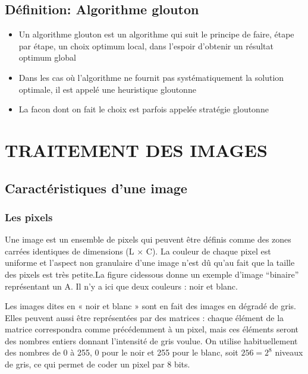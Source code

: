 \documentclass[letterpaper,10pt,english]{jupyterBook}
\begin{document}
\section{Définition: Algorithme glouton}
\label{\detokenize{notebooks/dynamicProgramming/glouton:definition-algorithme-glouton}}\begin{itemize}
\item {} 
\sphinxAtStartPar
Un algorithme glouton est un algorithme qui suit le principe de faire, étape par étape, un choix optimum local, dans l’espoir d’obtenir un résultat optimum global

\item {} 
\sphinxAtStartPar
Dans les cas où l’algorithme ne fournit pas systématiquement la solution optimale, il est appelé une heuristique gloutonne

\item {} 
\sphinxAtStartPar
La facon dont on fait le choix est parfois appelée stratégie gloutonne

\end{itemize}


\chapter{TRAITEMENT DES IMAGES}
\label{\detokenize{notebooks/images/TRAITEMENT-DES-IMAGES:traitement-des-images}}\label{\detokenize{notebooks/images/TRAITEMENT-DES-IMAGES::doc}}

\section{Caractéristiques d’une image}
\label{\detokenize{notebooks/images/TRAITEMENT-DES-IMAGES:caracteristiques-dune-image}}

\subsection{Les pixels}
\label{\detokenize{notebooks/images/TRAITEMENT-DES-IMAGES:les-pixels}}
\sphinxAtStartPar
Une image est un ensemble de pixels qui peuvent être définis comme des zones carrées identiques de dimensions (L × C). La couleur de chaque pixel est uniforme et l’aspect non granulaire d’une image n’est dû qu’au fait que la taille des pixels est très petite.La figure ci\sphinxhyphen{}dessous donne un exemple d’image “binaire” représentant un A. Il n’y a ici que deux couleurs : noir et blanc.

\sphinxAtStartPar
Les images dites en « noir et blanc » sont en fait des images en dégradé de gris. Elles peuvent aussi être représentées par des matrices : chaque élément de la matrice correspondra comme précédemment à un pixel, mais ces éléments seront des nombres entiers donnant l’intensité de gris voulue. On utilise habituellement des nombres de 0 à 255, 0 pour le noir et 255 pour le blanc, soit \(256 = 2^8\) niveaux de gris, ce qui permet de coder un pixel par 8 bits.
\end{document}
